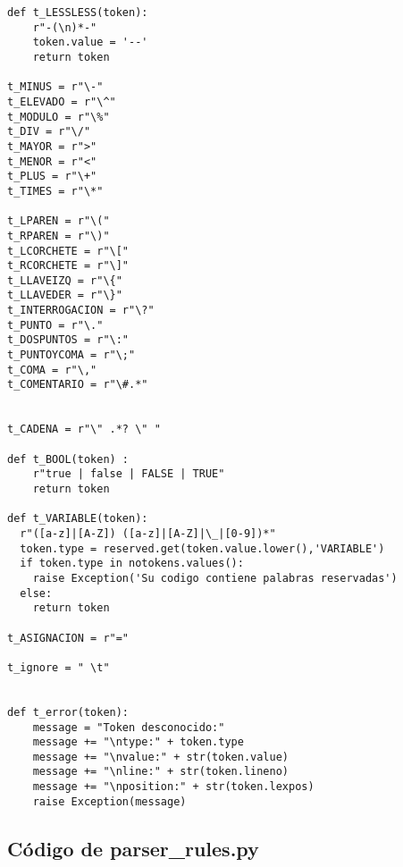 \begin{verbatim}
def t_LESSLESS(token):
    r"-(\n)*-"
    token.value = '--'
    return token

t_MINUS = r"\-"
t_ELEVADO = r"\^"
t_MODULO = r"\%"
t_DIV = r"\/"
t_MAYOR = r">"
t_MENOR = r"<"
t_PLUS = r"\+"
t_TIMES = r"\*"

t_LPAREN = r"\("
t_RPAREN = r"\)"
t_LCORCHETE = r"\["
t_RCORCHETE = r"\]"
t_LLAVEIZQ = r"\{"
t_LLAVEDER = r"\}"
t_INTERROGACION = r"\?"
t_PUNTO = r"\."
t_DOSPUNTOS = r"\:"
t_PUNTOYCOMA = r"\;"
t_COMA = r"\,"
t_COMENTARIO = r"\#.*"


t_CADENA = r"\" .*? \" "

def t_BOOL(token) : 
    r"true | false | FALSE | TRUE"
    return token

def t_VARIABLE(token):
  r"([a-z]|[A-Z]) ([a-z]|[A-Z]|\_|[0-9])*"
  token.type = reserved.get(token.value.lower(),'VARIABLE')
  if token.type in notokens.values():
  	raise Exception('Su codigo contiene palabras reservadas')
  else:	
	return token

t_ASIGNACION = r"="

t_ignore = " \t"


def t_error(token):
    message = "Token desconocido:"
    message += "\ntype:" + token.type
    message += "\nvalue:" + str(token.value)
    message += "\nline:" + str(token.lineno)
    message += "\nposition:" + str(token.lexpos)
    raise Exception(message)

\end{verbatim}

\subsection{Código de parser\_rules.py }

